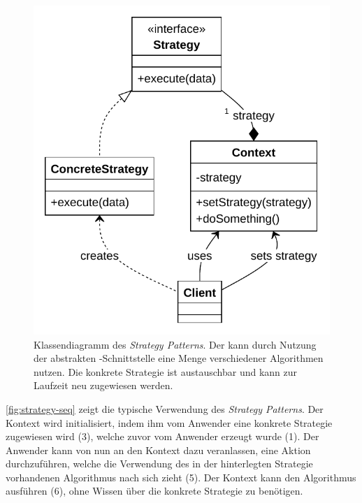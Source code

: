 \begin{figure}[!ht]
	\centering
	\includegraphics[width=0.75\linewidth]{images/patterns/strategy-class.pdf}
	\caption{Klassendiagramm des \emph{Strategy Patterns}. Der  kann durch Nutzung der abstrakten -Schnittstelle eine Menge verschiedener Algorithmen nutzen. Die konkrete Strategie ist austauschbar und kann zur Laufzeit neu zugewiesen werden. \cite{skobeleva_strategy_2023}}
	\label{fig:strategy-class}
\end{figure}

\autoref{fig:strategy-seq} zeigt die typische Verwendung des \emph{Strategy Patterns}. Der Kontext wird initialisiert, indem ihm vom Anwender eine konkrete Strategie zugewiesen wird (3), welche zuvor vom Anwender erzeugt wurde (1). Der Anwender kann von nun an den Kontext dazu veranlassen, eine Aktion durchzuführen, welche die Verwendung des in der hinterlegten Strategie vorhandenen Algorithmus nach sich zieht (5). Der Kontext kann den Algorithmus ausführen (6), ohne Wissen über die konkrete Strategie zu benötigen.

